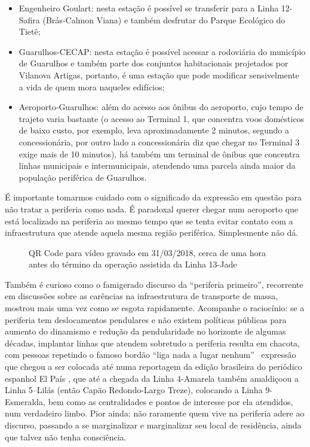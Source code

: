 \documentclass[11pt,fleqn]{book} %
\begin{document}
\begin{itemize}
	\item Engenheiro Goulart: nesta estação é possível se transferir para a Linha 12-Safira (Brás-Calmon Viana) e também desfrutar do Parque Ecológico do Tietê;
	\item Guarulhos-CECAP: nesta estação é possível acessar a rodoviária do município de Guarulhos e também parte dos conjuntos habitacionais projetados por Vilanova Artigas, portanto, é uma estação que pode modificar sensivelmente a vida de quem mora naqueles edifícios;
	\item Aeroporto-Guarulhos: além do acesso aos ônibus do aeroporto, cujo tempo de trajeto varia bastante (o acesso ao Terminal 1, que concentra voos domésticos de baixo custo, por exemplo, leva aproximadamente 2 minutos, segundo a concessionária, por outro lado a concessionária diz que chegar no Terminal 3 exige mais de 10 minutos), há também um terminal de ônibus que concentra linhas municipais e intermunicipais, atendendo uma parcela ainda maior da população periférica de Guarulhos.
\end{itemize}

É importante tomarmos cuidado com o significado da expressão em questão para não tratar a periferia como nada. É paradoxal querer chegar num aeroporto que está localizado na periferia ao mesmo tempo que se tenta evitar contato com a infraestrutura que atende aquela mesma região periférica. Simplesmente não dá.

\begin{wrapfigure}{l}{0.5\textwidth}
	\centering
	\caption[QR Code para vídeo dos ônibus do aeroporto internacional em 31/03/2018]{QR Code para vídeo gravado em 31/03/2018, cerca de uma hora antes do término da operação assistida da Linha 13-Jade}
	\label{qr:video_aeroporto}
\end{wrapfigure} 

Também é curioso como o famigerado discurso da “periferia primeiro”, recorrente em discussões sobre as carências na infraestrutura de transporte de massa, mostrou mais uma vez como se esgota rapidamente. Acompanhe o raciocínio: se a periferia tem deslocamentos pendulares e não existem políticas públicas para aumento do dinamismo e redução da pendularidade no horizonte de algumas décadas, implantar linhas que atendem sobretudo a periferia resulta em chacota, com pessoas repetindo o famoso bordão “liga nada a lugar nenhum” \textemdash\ expressão que chegou a ser colocada até numa reportagem da edição brasileira do periódico espanhol El País \textemdash, que até a chegada da Linha 4-Amarela também amaldiçoou a Linha 5–Lilás (então Capão Redondo-Largo Treze), colocando a Linha 9-Esmeralda, bem como as centralidades e pontos de interesse por ela atendidos, num verdadeiro limbo. Pior ainda: não raramente quem vive na periferia adere ao discurso, passando a se marginalizar e marginalizar seu local de residência, ainda que talvez não tenha consciência.
\end{document}
